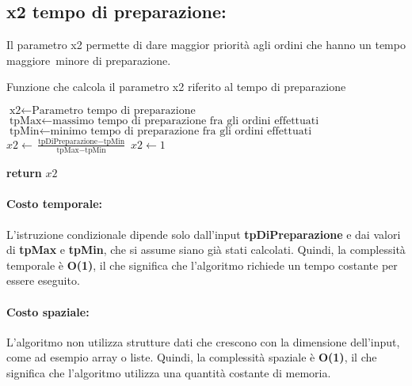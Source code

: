 \subsection{x2 tempo di preparazione:}
Il  parametro x2 permette di dare maggior priorità agli ordini che hanno un tempo maggiore\ minore di preparazione.
\begin{algorithm}[h]
	\begin{algorithmic}[h!]
		\caption{Funzione che calcola il parametro x2 riferito al tempo di preparazione }
		\medskip
		\State $\text{x2} \gets \text{Parametro tempo di preparazione}$
		\State $\text{tpMax} \gets \text{massimo tempo di preparazione fra gli ordini effettuati}$
		\State $\text{tpMin} \gets \text{minimo tempo di preparazione fra gli ordini effettuati}$
		\medskip
		\State $x2 \gets \frac{\text{tpDiPreparazione} - \text{tpMin}}{\text{tpMax} - \text{tpMin}}$ 
		\Else
		\State $x2 \gets 1$
		\EndIf
		
		\State \textbf{return} $x2$ 
		\EndFunction
	\end{algorithmic}
\end{algorithm}

\paragraph{Costo temporale:}
L'istruzione condizionale dipende solo dall'input \textbf{tpDiPreparazione} e dai valori di \textbf{tpMax} e \textbf{tpMin}, che si assume siano già stati calcolati. Quindi, la complessità temporale è \textbf{O(1)}, il che significa che l'algoritmo richiede un tempo costante per essere eseguito.

\paragraph{Costo spaziale:}
L'algoritmo non utilizza strutture dati che crescono con la dimensione dell'input, come ad esempio array o liste. Quindi, la complessità spaziale è \textbf{O(1)}, il che significa che l'algoritmo utilizza una quantità costante di memoria.

